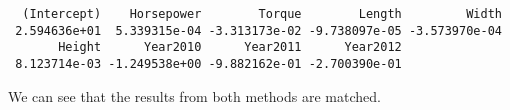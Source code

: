 \documentclass[
  letterpaper,
  DIV=11,
  numbers=noendperiod]{scrartcl}
\begin{document}
\begin{verbatim}
  (Intercept)    Horsepower        Torque        Length         Width 
 2.594636e+01  5.339315e-04 -3.313173e-02 -9.738097e-05 -3.573970e-04 
       Height      Year2010      Year2011      Year2012 
 8.123714e-03 -1.249538e+00 -9.882162e-01 -2.700390e-01 
\end{verbatim}

We can see that the results from both methods are matched.
\end{document}
